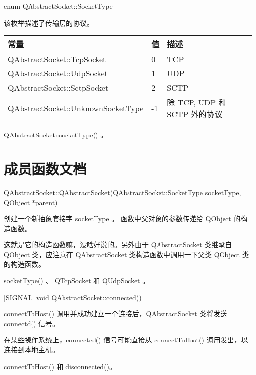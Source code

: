 enum QAbstractSocket::SocketType

该枚举描述了传输层的协议。

\begin{tabular}{|l|l|l|}
\hline
常量&	值&	描述 \\ 
\hline
QAbstractSocket::TcpSocket&	0&	TCP \\ 
\hline
QAbstractSocket::UdpSocket&	1&	UDP\\ 
\hline
QAbstractSocket::SctpSocket&	2&	SCTP\\
\hline
QAbstractSocket::UnknownSocketType&	-1&	除 TCP, UDP 和 SCTP 外的协议\\
\hline
\end{tabular}



\begin{notice}[另请查阅]
QAbstractSocket::socketType() 。
\end{notice}

\splitLine


\section{成员函数文档}

QAbstractSocket::QAbstractSocket(QAbstractSocket::SocketType
socketType, QObject *parent)

创建一个新抽象套接字 socketType 。 函数中父对象的参数传递给 QObject 的构造函数。

这就是它的构造函数嘛，没啥好说的。另外由于 QAbstractSocket 类继承自 QObject 类，应注意在 QAbstractSocket 类构造函数中调用一下父类 QObject 类的构造函数。


\begin{notice}[另请查阅]
socketType() 、 QTcpSocket 和 QUdpSocket 。
\end{notice}


[SIGNAL] void QAbstractSocket::connected()

connectToHost() 调用并成功建立一个连接后，QAbstractSocket 类将发送 connectd() 信号。


\begin{notice}
在某些操作系统上，connected() 信号可能直接从 connectToHost() 调用发出，以连接到本地主机。
\end{notice}


\begin{notice}[另请查阅]
connectToHost() 和 disconnected()。
\end{notice}



